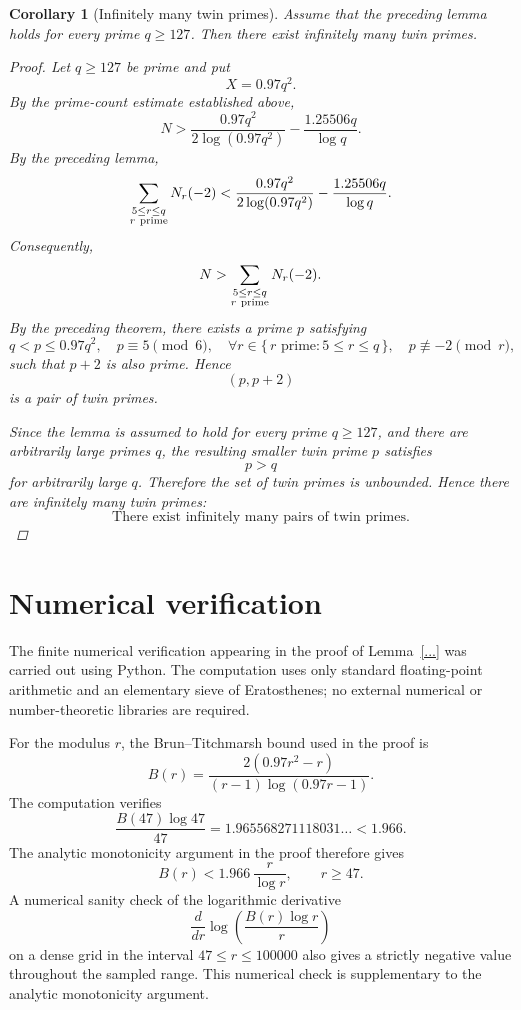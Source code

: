 \documentclass[11pt,a4paper]{article}
\newtheorem{corollary}[theorem]{Corollary}
\theoremstyle{definition}
\theoremstyle{remark}
\begin{document}
\begin{corollary}[Infinitely many twin primes]
Assume that the preceding lemma holds for every prime \(q\ge127\). Then there exist infinitely many twin primes.

\begin{proof}
Let \(q\ge127\) be prime and put
\[
X=0.97q^2.
\]
By the prime-count estimate established above,
\[
N>
\frac{0.97q^2}{2\log(0.97q^2)}
-\frac{1.25506q}{\log q}.
\]
By the preceding lemma,
\[
\sum_{\substack{5\le r\le q\\r\ {\rm prime}}}N_r(-2)
<
\frac{0.97q^2}{2\log(0.97q^2)}
-\frac{1.25506q}{\log q}.
\]
Consequently,
\[
N>
\sum_{\substack{5\le r\le q\\r\ {\rm prime}}}N_r(-2).
\]
By the preceding theorem, there exists a prime \(p\) satisfying
\[
q<p\le0.97q^2,
\quad
p\equiv5\pmod6,
\quad
\forall r\in\{\,r\text{ prime}:5\le r\le q\,\},\quad
p\not\equiv -2\pmod r,
\]
such that \(p+2\) is also prime. Hence
\[
(p,p+2)
\]
is a pair of twin primes.

Since the lemma is assumed to hold for every prime \(q\ge127\), and there are arbitrarily large primes \(q\), the resulting smaller twin prime \(p\) satisfies
\[
p>q
\]
for arbitrarily large \(q\). Therefore the set of twin primes is unbounded. Hence there are infinitely many twin primes:
\[
\boxed{\text{There exist infinitely many pairs of twin primes.}}
\]
\end{proof}
\end{corollary}


\appendix
\section{Numerical verification}

The finite numerical verification appearing in the proof of
Lemma~\ref{...} was carried out using Python. The computation uses
only standard floating-point arithmetic and an elementary sieve of
Eratosthenes; no external numerical or number-theoretic libraries are
required.

For the modulus $r$, the Brun--Titchmarsh bound used in the proof is
\[
B(r)
=
\frac{2(0.97r^2-r)}
{(r-1)\log(0.97r-1)}.
\]
The computation verifies
\[
\frac{B(47)\log47}{47}
=
1.965568271118031\ldots
<
1.966.
\]
The analytic monotonicity argument in the proof therefore gives
\[
B(r)<1.966\,\frac r{\log r},
\qquad r\ge47.
\]
A numerical sanity check of the logarithmic derivative
\[
\frac{d}{dr}\log\left(\frac{B(r)\log r}{r}\right)
\]
on a dense grid in the interval $47\le r\le100000$ also gives a
strictly negative value throughout the sampled range. This numerical
check is supplementary to the analytic monotonicity argument.
\end{document}

